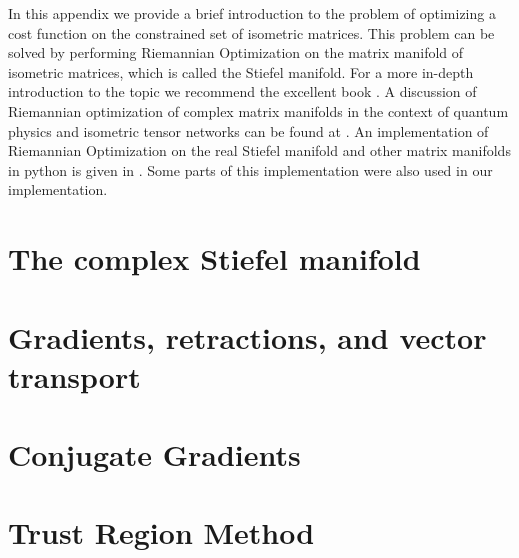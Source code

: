 In this appendix we provide a brief introduction to the problem of optimizing a cost function on the constrained set of isometric matrices. This problem can be solved by performing Riemannian Optimization on the matrix manifold of isometric matrices, which is called the Stiefel manifold. For a more in-depth introduction to the topic we recommend the excellent book \cite{cite:optimization_on_matrix_manifolds}. A discussion of Riemannian optimization of complex matrix manifolds in the context of quantum physics and isometric tensor networks can be found at \cite{cite:riemannian_geometry_automatic_differentiation_quantum_physics, cite:riemannian_optimization_isometric_tensor_networks}. An implementation of Riemannian Optimization on the real Stiefel manifold and other matrix manifolds in python is given in \cite{cite:pymanopt}. Some parts of this implementation were also used in our implementation.

\section{The complex Stiefel manifold}
\label{sec:the_complex_stiefel_manifold}


\section{Gradients, retractions, and vector transport}
\label{sec:gradients_retractions_vector_transport}


\section{Conjugate Gradients}
\label{sec:conjugate_gradients}


\section{Trust Region Method}
\label{sec:trust_region_method}
